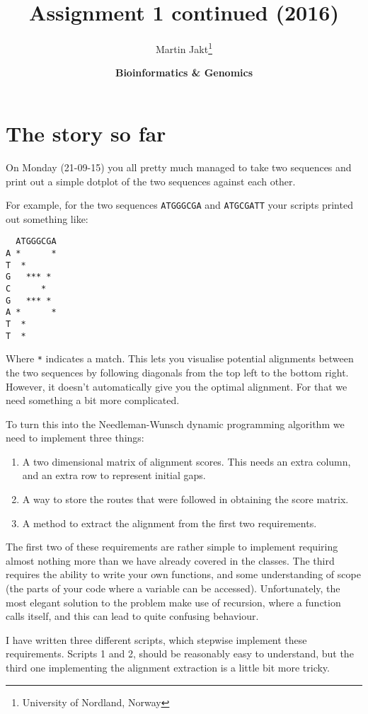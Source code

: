 \documentclass[11pt]{article}
\author{Martin Jakt\thanks{University of Nordland, Norway}}
\date{\textbf{Bioinformatics \& Genomics}}
\title{\textbf{Assignment 1 continued} (2016)}
\begin{document}
\maketitle

\section{The story so far}
\label{sec-1}
On Monday (21-09-15) you all pretty much managed to take two sequences
and print out a simple dotplot of the two sequences against each other.

For example, for the two sequences \texttt{ATGGGCGA}
and \texttt{ATGCGATT} your scripts printed out something like:
\begin{spacing}{0.75}
\begin{verbatim}
  ATGGGCGA
A *      *
T  *     
G   *** *
C      * 
G   *** * 
A *      *
T  *      
T  *      
\end{verbatim}
\end{spacing}
Where \texttt{*} indicates a match. This lets you visualise potential
alignments between the two sequences by following diagonals from the
top left to the bottom right. However, it doesn't automatically give
you the optimal alignment. For that we need something a bit more complicated.

To turn this into the Needleman-Wunsch dynamic programming algorithm we
need to implement three things:
\begin{enumerate}
\item A two dimensional matrix of alignment scores. This needs an
  extra column, and an extra row to represent initial gaps.
\item A way to store the routes that were followed in obtaining
  the score matrix.
\item A method to extract the alignment from the first two requirements.
\end{enumerate}
The first two of these requirements are rather simple to implement requiring
almost nothing more than we have already covered in the classes. The third
requires the ability to write your own functions, and some understanding of
scope (the parts of your code where a variable can be accessed). Unfortunately,
the most elegant solution to the problem make use of recursion,
where a function calls itself, and this can lead to quite confusing behaviour.

I have written three different scripts, which stepwise implement these
requirements. Scripts 1 and 2, should be reasonably easy to understand,
but the third one implementing the alignment extraction is a little bit
more tricky.
\end{document}
